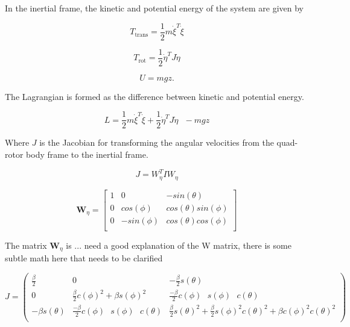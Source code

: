 \noindent In the inertial frame, the kinetic and potential energy of the system are given by

\begin{equation}
    T_{\text{trans}}=\frac{1}{2}m\dot{\xi }^T\dot{\xi }
\end{equation}


\begin{equation}
    T_{\text{rot}}= \frac{1}{2}\dot{\eta }^T J \dot{\eta } 
\end{equation}


\begin{equation}
    U = m g z.
\end{equation}


The Lagrangian is formed as the difference between kinetic and potential energy.

\begin{equation}
    L = \frac{1}{2}m\dot{\xi }^T\dot{\xi }+\frac{1}{2}\dot{\eta }^T   J   \dot{\eta }\text{  }- m g z
\end{equation}

Where $J$ is the Jacobian for transforming the angular velocities from the quad-rotor body frame to the inertial frame.

\begin{equation}
    J = W_{\eta}^T I W_{\eta} 
\end{equation}

\begin{equation}
\boldsymbol W_{\eta} = \left[ \begin{array}{ccc}

1 & 0 & -sin(\theta)\\ 0 & cos(\phi) & cos(\theta) sin(\phi)\\ 0 & -sin(\phi) & cos(\theta) cos(\phi)\\

\end{array} \right]
\end{equation}



\noindent The matrix $\boldsymbol W_{\eta}$ is ...{\color{red} need a good explanation of the W matrix, there is some subtle math here that needs to be clarified}




\begin{equation}
J= \left(
\begin{array}{ccc}
 \frac{\beta }{2}    & 0                                                                    & -\frac{\beta }{2}s(\theta) \\
 0                   & \frac{\beta}{2} c(\phi)^2 + \beta s(\phi)^2                       & \frac{- \beta}{2} c(\phi) \text{ } s(\phi) \text{ } c(\theta)  \\
 -\beta s(\theta)   & \frac{- \beta}{2} c(\phi) \text{ } s(\phi) \text{ } c(\theta)    & \frac{\beta }{2}s(\theta)^2 + \frac{\beta }{2} s(\phi)^2  c(\theta)^2 + \beta  c(\phi)^2  c(\theta)^2  \\
\end{array}
\right)
\end{equation}




